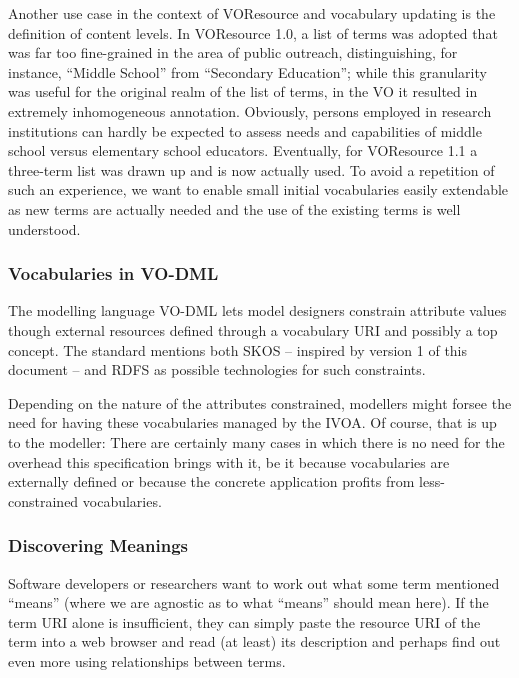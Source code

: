 \documentclass[11pt,a4paper]{ivoa}
\begin{document}
Another use case in the context of VOResource and vocabulary updating
is the definition of content levels.  In VOResource 1.0, a list of
terms was adopted that was far too fine-grained in the area of public
outreach, distinguishing, for instance, ``Middle School'' from
``Secondary Education''; while this granularity was useful for the
original realm of the list of terms, in the VO it resulted in extremely
inhomogeneous annotation.  Obviously, persons employed in research
institutions can hardly be expected to assess needs and capabilities of
middle school versus elementary school educators.  Eventually, for
VOResource 1.1 a three-term list was drawn up and is now actually used.
To avoid a repetition of such an experience, we want to enable small
initial vocabularies easily extendable as new terms are actually needed
and the use of the existing terms is well understood.


\subsubsection{Vocabularies in VO-DML}

The modelling language VO-DML \citep{2018ivoa.spec.0910L} lets model
designers constrain attribute values though external resources defined
through a vocabulary URI and possibly a top concept.  The standard
mentions both SKOS -- inspired by version 1 of this document -- and RDFS
as possible technologies for such constraints.

Depending on the nature of the attributes constrained, modellers might
forsee the need for having these vocabularies managed by the IVOA.  Of
course, that is up to the modeller: There are certainly many cases in
which there is no need for the overhead this specification brings with
it, be it because vocabularies are externally defined or because the
concrete application profits from less-constrained vocabularies.

\subsubsection{Discovering Meanings}
\label{uc:discovering}

Software developers or researchers want to work out
what some term mentioned ``means'' (where we are agnostic as to what
``means'' should mean here).  If the term URI alone is insufficient,
they can simply paste the resource URI of the term into a web browser
and read (at least) its description and perhaps find out even more using
relationships between terms.
\end{document}
